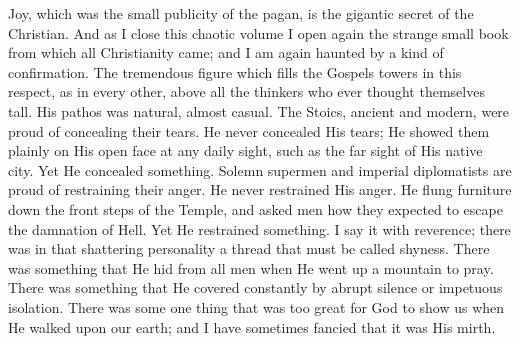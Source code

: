 \documentclass{book}
\begin{document}
Joy, which was the small publicity of the pagan, is the gigantic secret of the Christian. And as I close this chaotic volume I open again the strange small book from which all Christianity came; and I am again haunted by a kind of confirmation. The tremendous figure which fills the Gospels towers in this respect, as in every other, above all the thinkers who ever thought themselves tall. His pathos was natural, almost casual. The Stoics, ancient and modern, were proud of concealing their tears. He never concealed His tears; He showed them plainly on His open face at any daily sight, such as the far sight of His native city. Yet He concealed something. Solemn supermen and imperial diplomatists are proud of restraining their anger. He never restrained His anger. He flung furniture down the front steps of the Temple, and asked men how they expected to escape the damnation of Hell. Yet He restrained something. I say it with reverence; there was in that shattering personality a thread that must be called shyness. There was something that He hid from all men when He went up a mountain to pray. There was something that He covered constantly by abrupt silence or impetuous isolation. There was some one thing that was too great for God to show us when He walked upon our earth; and I have sometimes fancied that it was His mirth.
\end{document}

